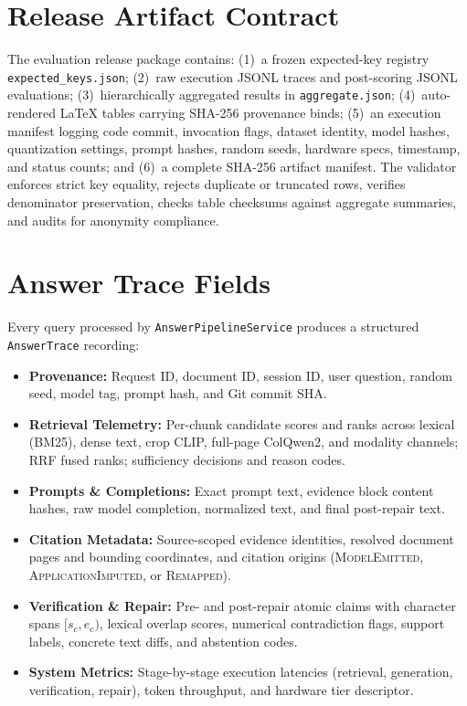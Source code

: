 \section{Release Artifact Contract}
The evaluation release package contains: (1)~a frozen expected-key registry \texttt{expected\_}\allowbreak\texttt{keys.json}; (2)~raw execution JSONL traces and post-scoring JSONL evaluations; (3)~hierarchically aggregated results in \texttt{aggregate.json}; (4)~auto-rendered \LaTeX{} tables carrying SHA-256 provenance binds; (5)~an execution manifest logging code commit, invocation flags, dataset identity, model hashes, quantization settings, prompt hashes, random seeds, hardware specs, timestamp, and status counts; and (6)~a complete SHA-256 artifact manifest. The validator enforces strict key equality, rejects duplicate or truncated rows, verifies denominator preservation, checks table checksums against aggregate summaries, and audits for anonymity compliance.

\section{Answer Trace Fields}
Every query processed by \texttt{AnswerPipeline}\allowbreak\texttt{Service} produces a structured \texttt{AnswerTrace} recording:
\begin{itemize}
    \setlength{\itemsep}{0pt}\setlength{\parskip}{0pt}
    \item \textbf{Provenance:} Request ID, document ID, session ID, user question, random seed, model tag, prompt hash, and Git commit SHA.
    \item \textbf{Retrieval Telemetry:} Per-chunk candidate scores and ranks across lexical (BM25), dense text, crop CLIP, full-page ColQwen2, and modality channels; RRF fused ranks; sufficiency decisions and reason codes.
    \item \textbf{Prompts \& Completions:} Exact prompt text, evidence block content hashes, raw model completion, normalized text, and final post-repair text.
    \item \textbf{Citation Metadata:} Source-scoped evidence identities, resolved document pages and bounding coordinates, and citation origins (\textsc{ModelEmitted}, \textsc{ApplicationImputed}, or \textsc{Remapped}).
    \item \textbf{Verification \& Repair:} Pre- and post-repair atomic claims with character spans $[s_c, e_c)$, lexical overlap scores, numerical contradiction flags, support labels, concrete text diffs, and abstention codes.
    \item \textbf{System Metrics:} Stage-by-stage execution latencies (retrieval, generation, verification, repair), token throughput, and hardware tier descriptor.
\end{itemize}

